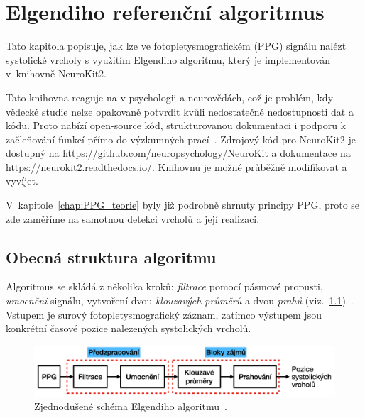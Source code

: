 \chapter{Elgendiho referenční algoritmus}
\label{chap:elgendi_neurokit}

Tato kapitola popisuje, jak lze ve fotopletysmografickém (\acs{PPG}) signálu nalézt systolické vrcholy s využitím Elgendiho algoritmu, který je implementován v~knihovně NeuroKit2.

Tato knihovna reaguje na  v psychologii a neurovědách, což je problém, kdy vědecké studie nelze opakovaně potvrdit kvůli nedostatečné nedostupnosti dat a kódu.
Proto nabízí open-source kód, strukturovanou dokumentaci i podporu k začleňování funkcí přímo do výzkumných prací~\cite{NeuroKit2}.
Zdrojový kód pro NeuroKit2 je dostupný na \url{https://github.com/neuropsychology/NeuroKit} a dokumentace na \url{https://neurokit2.readthedocs.io/}.
Knihovnu je možné průběžně modifikovat a vyvíjet.

V~kapitole~\ref{chap:PPG_teorie} byly již podrobně shrnuty principy \acs{PPG}, proto se zde zaměříme na samotnou detekci vrcholů a její realizaci.

\section{Obecná struktura algoritmu}
\label{sec:alg_structure}

Algoritmus se skládá z několika kroků: \emph{filtrace} pomocí pásmové propusti, \emph{umocnění} signálu, vytvoření dvou \emph{klouzavých průměrů} a dvou \emph{prahů} (viz.~\ref{fig:alg-scheme})~\cite{Elgendi2013}.
Vstupem je surový fotopletysmografický záznam, zatímco výstupem jsou konkrétní časové pozice nalezených systolických vrcholů.

\begin{figure}[h]
	\centering
	\includegraphics[width=1\textwidth]{./obrazky/ElgendiBlokSchema.png}
	\vspace{-5mm}
	\caption[Struktura Elgendiho algoritmu]{Zjednodušené schéma Elgendiho algoritmu~\cite{Elgendi2013}.}
	\vspace{-5mm}
	\label{fig:alg-scheme}
\end{figure}

